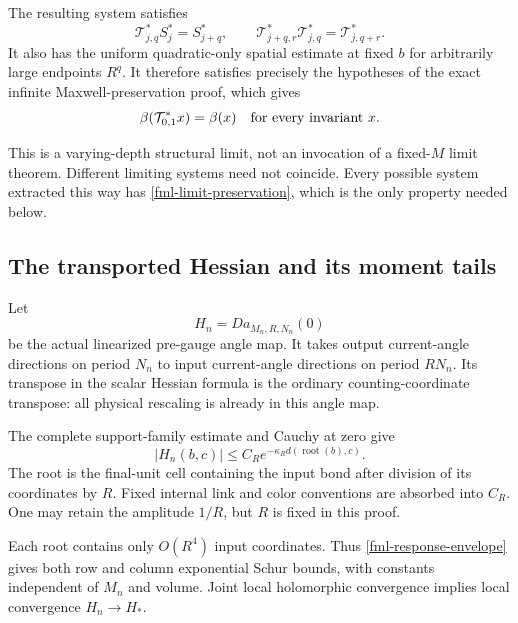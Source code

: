 \documentclass[11pt]{article}
\theoremstyle{remark}
\begin{document}
The resulting system satisfies
\begin{equation}
 \mathcal T_{j,q}^*S_j^*=S_{j+q}^*,\qquad
 \mathcal T_{j+q,r}^*\mathcal T_{j,q}^*
                         =\mathcal T_{j,q+r}^*.
 \label{fml-limit-semigroup}
\end{equation}
It also has the uniform quadratic-only spatial estimate
at fixed \(b\) for arbitrarily large endpoints \(R^q\).
It therefore satisfies precisely the hypotheses of
the exact infinite Maxwell-preservation proof, which gives
\begin{equation}
                   \beta(\mathcal T_{0,1}^*x)=\beta(x)
                   \quad\hbox{for every invariant }x.
 \label{fml-limit-preservation}
\end{equation}

This is a varying-depth structural limit, not an invocation
of a fixed-\(M\) limit theorem. Different limiting systems
need not coincide. Every possible system extracted this
way has \eqref{fml-limit-preservation}, which is the only
property needed below.

\subsection{The transported Hessian and its moment tails}
\label{fml-Hessian-section}

Let
\begin{equation}
                       H_n=Da_{M_n,R,N_n}(0)
 \label{fml-linear-response}
\end{equation}
be the actual linearized pre-gauge angle map. It takes
output current-angle directions on period \(N_n\) to
input current-angle directions on period \(RN_n\).
Its transpose in the scalar Hessian formula is the
ordinary counting-coordinate transpose: all physical
rescaling is already in this angle map.

The complete support-family estimate and Cauchy at zero
give
\begin{equation}
 |H_n(b,c)|
       \le C_R e^{-\kappa_R d(\operatorname{root}(b),c)}.
 \label{fml-response-envelope}
\end{equation}
The root is the final-unit cell containing the input
bond after division of its coordinates by \(R\).
Fixed internal link and color conventions are absorbed
into \(C_R\). One may retain the amplitude \(1/R\), but
\(R\) is fixed in this proof.

Each root contains only \(O(R^4)\) input coordinates.
Thus \eqref{fml-response-envelope} gives both row and
column exponential Schur bounds, with constants independent
of \(M_n\) and volume. Joint local holomorphic convergence
implies local convergence \(H_n\to H_*\).
\end{document}
